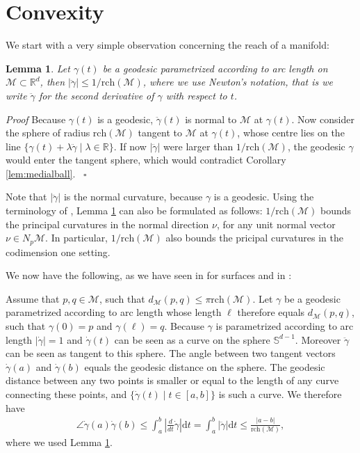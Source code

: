 \documentclass{article}
\newenvironment{proof}[1][{}]{%
  \begin{trivlist}\item[]\textit{Proof #1}\quad}%
  {\hfill\hspace*{\fill}~$\square$\end{trivlist}}
\newtheorem{lemma}[theorem]{Lemma}
\newcommand{\ud}{\mathrm{d}}
\newcommand{\M}{\mathcal{M}}
\newcommand{\rch}{\mathrm{rch}}
\begin{document}
\section{Convexity}


We start with a very simple observation concerning the reach of a manifold:
\begin{lemma}
\label{lem:ReachSecondDer}
Let $\gamma(t)$ be a geodesic parametrized according to arc length on $\M \subset \mathbb{R}^d$, then $|\ddot{\gamma} | \leq 1/ \rch (\M)$, where we use Newton's notation, that is we write $\ddot{\gamma}$ for the second derivative of $\gamma$ with respect to $t$. 
\end{lemma}
\begin{proof} 
Because $\gamma(t)$ is a geodesic, $\ddot{\gamma}(t)$ is normal to $\M$ at $\gamma(t)$. Now consider the sphere of radius $\rch(\M)$ tangent to $\M$ at $\gamma(t)$, whose centre lies on the line $\{ \gamma(t)+ \lambda \ddot{\gamma}  \mid \lambda \in \mathbb{R} \}$. If now $|\ddot{\gamma} | $ were larger than $1/ \rch (\M)$, the geodesic $\gamma$ would enter the tangent sphere, which would contradict Corollary \ref{lem:medialball}.
\end{proof}

Note that $|\ddot{\gamma} | $ is the normal curvature, because $\gamma$ is a geodesic. Using the terminology of \cite[Section 6]{niyogi2008}, Lemma \ref{lem:ReachSecondDer} can also be formulated as follows: $1/ \rch (\M)$ bounds the principal curvatures in the normal direction $\nu$, for any unit normal vector $\nu\in N_p \M$. In particular, $1/ \rch (\M)$ also bounds the pricipal curvatures in the codimension one setting. 


We now have the following, as we have seen in \cite{attali:hal-00201055} for surfaces and in \cite{TangentVar}: 

Assume that $p,q \in \M $, such that $d_\M (p,q) \leq \pi \rch(\M)$. 
Let $\gamma$ be a geodesic parametrized according to arc length whose length $\ell$ therefore equals $d_\M (p,q)$, such that $\gamma(0)=p$ and $\gamma(\ell)=q$. Because $\gamma$ is parametrized according to arc length $| \dot{\gamma} |=1$ and $\dot{\gamma}(t)$ can be seen as a curve on the sphere $\mathbb{S}^{d-1}$. Moreover $\ddot{\gamma}$ can be seen as tangent to this sphere. The angle between two tangent vectors $\dot{\gamma}(a)$ and $\dot{\gamma}(b)$ equals the geodesic distance on the sphere. The geodesic distance between any two points is smaller or equal to the length of any curve connecting these points, and $\{\dot{\gamma}(t) \mid t \in [a,b] \}$ is such a curve. We therefore have
\begin{align}
\angle \dot{\gamma}(a) \dot{\gamma}(b) 
\leq \int_{a}^{b} \left | \frac{d}{dt} \dot{\gamma} \right| \ud t 
=\int_{a}^{b} |  \ddot{\gamma} | \ud t 
\leq \frac{|a-b| } {\rch(\M)} ,
\label{eq:angleEst1}
\end{align}
where we used Lemma \ref{lem:ReachSecondDer}. 
\end{document}
